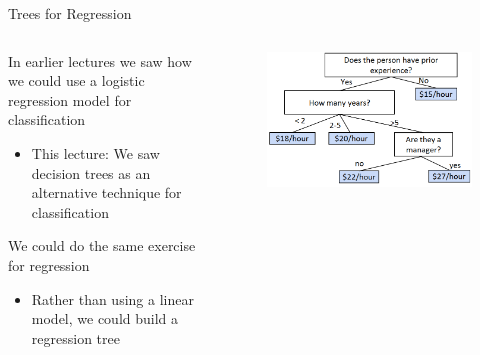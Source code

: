 \documentclass[aspectratio=169]{../latex_main/tntbeamer}  %
\begin{document}
	\begin{frame}{Trees for Regression}
	    \begin{columns}
	    \begin{column}{.5\textwidth}
	        In earlier lectures we saw how we could use a logistic regression model for classification
            \begin{itemize}
                \item This lecture: We saw decision trees as an alternative technique for classification
            \end{itemize}
            \bigskip
            We could do the same exercise for regression
            \begin{itemize}
                \item Rather than using a linear model, we could build a regression tree
            \end{itemize}
        \end{column}
	    
        \begin{column}{.5\textwidth}
            
        
	        \begin{figure}
	            \centering
	            \includegraphics[scale=.4]{Bild58}
	        \end{figure}
	   \end{column}
	    \end{columns}
	\end{frame}
	
	
	
\end{document}
